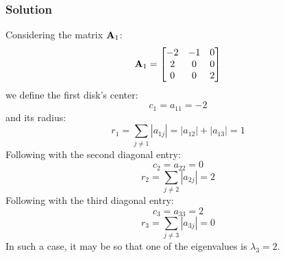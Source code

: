 \subsubsection*{Solution}
Considering the matrix $\mathbf{A}_1$:
\begin{equation*}
    \mathbf{A}_1 = 
    \begin{bmatrix}
        -2 & -1 &  0\\
         2 &  0 &  0\\
         0 &  0 &  2 
    \end{bmatrix}
\end{equation*}
we define the first disk's center:
\begin{equation*}
     c_1 = a_{11} = -2
\end{equation*}
and its radius:
\begin{equation*}
    r_1 = \sum_{j \neq 1} |a_{1j}| = |a_{12}| + |a_{13}| = 1 
\end{equation*}
Following with the second diagonal entry:
\begin{equation*}
    c_2 = a_{22} = 0
\end{equation*}
\begin{equation*}
    r_2 = \sum_{j \neq 2} |a_{2j}| = 2
\end{equation*}
Following with the third diagonal entry:
\begin{equation*}
    c_3 = a_{33} = 2
\end{equation*}
\begin{equation*}
    r_3 = \sum_{j \neq 3} |a_{3j}| = 0
\end{equation*}
In such a case, it may be so that one of the eigenvalues is $\lambda_3 = 2$.

